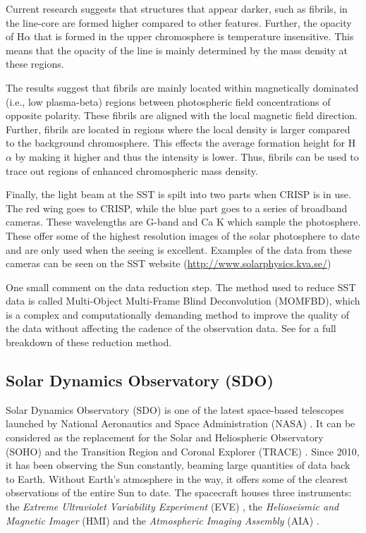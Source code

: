     Current research suggests that structures that appear darker, such as fibrils, in the line-core are formed higher compared to other features.
    Further, the opacity of H$\alpha$ that is formed in the upper chromosphere is temperature insensitive.
    This means that the opacity of the line is mainly determined by the mass density at these regions.
    
    The results suggest that fibrils are mainly located within magnetically dominated (i.e., low plasma-beta) regions between photospheric field concentrations of opposite polarity.
    These fibrils are aligned with the local magnetic field direction.
    Further, fibrils are located in regions where the local density is larger compared to the background chromosphere. 
    This effects the average formation height for H$\alpha$ by making it higher and thus the intensity is lower.
    Thus, fibrils can be used to trace out regions of enhanced chromospheric mass density. 
    
    Finally, the light beam at the SST is spilt into two parts when CRISP is in use.
    The red wing goes to CRISP, while the blue part goes to a series of broadband cameras.
    These wavelengths are G-band and Ca K which sample the photosphere.
    These offer some of the highest resolution images of the solar photosphere to date and are only used when the seeing is excellent. 
    Examples of the data from these cameras can be seen on the SST website (\url{http://www.solarphysics.kva.se/})
    
    One small comment on the data reduction step.
    The method used to reduce SST data is called Multi-Object Multi-Frame Blind Deconvolution (MOMFBD), which is a complex and computationally demanding method to improve the quality of the data without affecting the cadence of the observation data. 
    See \cite{Noort2005} for a full breakdown of these reduction method. 
    
\subsection{Solar Dynamics Observatory (SDO)}

	Solar Dynamics Observatory (SDO) is one of the latest space-based telescopes launched by National Aeronautics and Space Administration (NASA) \citep{2012SoPh..275....3P}.
	It can be considered as the replacement for the Solar and Heliospheric Observatory (SOHO) \citep{domingo1995soho} and the Transition Region and Coronal Explorer (TRACE) \citep{TRACE}.
    Since 2010, it has been observing the Sun constantly, beaming large quantities of data back to Earth.
	Without Earth's atmosphere in the way, it offers some of the clearest observations of the entire Sun to date. 
	The spacecraft houses three instruments: the \textit{Extreme Ultraviolet Variability Experiment} (EVE) \citep{2012SoPh..275..115W}, the \textit{Helioseismic and Magnetic Imager} (HMI) \citep{2012SoPh..275..229S} and the \textit{Atmospheric Imaging Assembly} (AIA) \citep{2012SoPh..275...17L}.
	 

